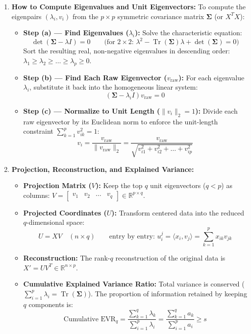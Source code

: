 \documentclass[10pt,a4paper]{article}
\begin{document}
\begin{enumerate}[leftmargin=18pt, itemsep=5pt, topsep=2pt]
    \item \textbf{How to Compute Eigenvalues and Unit Eigenvectors:}
    To compute the eigenpairs $(\lambda_i, v_i)$ from the $p \times p$ symmetric covariance matrix $\mathbf{\Sigma}$ (or $X^T X$):
    \begin{itemize}[leftmargin=12pt, itemsep=3pt]
        \item \textbf{Step (a) --- Find Eigenvalues ($\lambda_i$):} Solve the characteristic equation:
        \[
        \det(\mathbf{\Sigma} - \lambda I) = 0 \qquad \text{(for $2 \times 2$: } \lambda^2 - \operatorname{Tr}(\mathbf{\Sigma})\lambda + \det(\mathbf{\Sigma}) = 0\text{)}
        \]
        Sort the resulting real, non-negative eigenvalues in descending order: $\lambda_1 \ge \lambda_2 \ge \dots \ge \lambda_p \ge 0$.
        \item \textbf{Step (b) --- Find Each Raw Eigenvector ($v_{\text{raw}}$):} For each eigenvalue $\lambda_i$, substitute it back into the homogeneous linear system:
        \[
        (\mathbf{\Sigma} - \lambda_i I) v_{\text{raw}} = 0
        \]
        \item \textbf{Step (c) --- Normalize to Unit Length ($\|v_i\|_2 = 1$):} Divide each raw eigenvector by its Euclidean norm to enforce the unit-length constraint $\sum_{k=1}^p v_{ik}^2 = 1$:
        \[
        v_i = \frac{v_{\text{raw}}}{\|v_{\text{raw}}\|_2} = \frac{v_{\text{raw}}}{\sqrt{v_{i1}^2 + v_{i2}^2 + \dots + v_{ip}^2}}
        \]
    \end{itemize}

    \item \textbf{Projection, Reconstruction, and Explained Variance:}
    \begin{itemize}[leftmargin=12pt, itemsep=2pt]
        \item \textbf{Projection Matrix ($V$):} Keep the top $q$ unit eigenvectors ($q < p$) as columns: $V = \begin{bmatrix} v_1 & v_2 & \dots & v_q \end{bmatrix} \in \mathbb{R}^{p \times q}$.
        \item \textbf{Projected Coordinates ($U$):} Transform centered data into the reduced $q$-dimensional space:
        \[
        U = X V \quad (n \times q) \qquad \text{entry by entry: } u_i^j = \langle x_i, v_j \rangle = \sum_{k=1}^p x_{ik} v_{jk}
        \]
        \item \textbf{Reconstruction:} The rank-$q$ reconstruction of the original data is $X' = U V^T \in \mathbb{R}^{n \times p}$.
        \item \textbf{Cumulative Explained Variance Ratio:} Total variance is conserved ($\sum_{i=1}^p \lambda_i = \operatorname{Tr}(\mathbf{\Sigma})$). The proportion of information retained by keeping $q$ components is:
        \[
        \text{Cumulative EVR}_q = \frac{\sum_{k=1}^q \lambda_k}{\sum_{i=1}^p \lambda_i} = \frac{\sum_{k=1}^q a_k}{\sum_{i=1}^p a_i} \ge s
        \]
    \end{itemize}
\end{enumerate}
\end{document}
